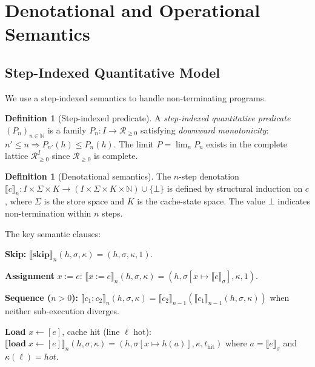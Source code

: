 \documentclass[acmsmall,sigplan,anonymous,review,screen]{acmart}
\theoremstyle{plain}
\theoremstyle{definition}
\newtheorem{definition}[theorem]{Definition}
\begin{document}
\section{Denotational and Operational Semantics}
\label{sec:semantics}

\subsection{Step-Indexed Quantitative Model}
\label{sec:semantics:model}

We use a step-indexed semantics to handle non-terminating programs.

\begin{definition}[Step-indexed predicate]
\label{def:si-pred}
  A \emph{step-indexed quantitative predicate} $(P_n)_{n \in \mathbb{N}}$
  is a family $P_n : I \to \mathcal{R}_{\geq 0}$ satisfying
  \emph{downward monotonicity}: $n' \leq n \Rightarrow P_{n'}(h) \leq P_n(h)$.
  The limit $P = \lim_n P_n$ exists in the complete lattice
  $\mathcal{R}_{\geq 0}^I$ since $\mathcal{R}_{\geq 0}$ is complete.
\end{definition}

\begin{definition}[Denotational semantics]
\label{def:denotation}
  The $n$-step denotation
  $\llbracket c \rrbracket_n : I \times \Sigma \times K \to
  (I \times \Sigma \times K \times \mathbb{N}) \cup \{\bot\}$
  is defined by structural induction on $c$, where $\Sigma$ is the
  store space and $K$ is the cache-state space.
  The value $\bot$ indicates non-termination within $n$ steps.
\end{definition}

The key semantic clauses:

\medskip
\noindent\textbf{Skip:}
$\llbracket \mathbf{skip} \rrbracket_n(h, \sigma, \kappa) = (h, \sigma, \kappa, 1)$.

\medskip
\noindent\textbf{Assignment} $x := e$:
$\llbracket x := e \rrbracket_n(h, \sigma, \kappa) = (h, \sigma[x \mapsto \llbracket e \rrbracket_\sigma], \kappa, 1)$.

\medskip
\noindent\textbf{Sequence ($n > 0$):}
$\llbracket c_1 ; c_2 \rrbracket_n(h, \sigma, \kappa) =
\llbracket c_2 \rrbracket_{n-1}(\llbracket c_1 \rrbracket_{n-1}(h, \sigma, \kappa))$
when neither sub-execution diverges.

\medskip
\noindent\textbf{Load} $x \leftarrow [e]$, cache hit (line $\ell$ hot):
$\llbracket \mathbf{load}\; x \leftarrow [e] \rrbracket_n(h, \sigma, \kappa) =
(h, \sigma[x \mapsto h(a)], \kappa, t_{\mathrm{hit}})$
where $a = \llbracket e \rrbracket_\sigma$ and $\kappa(\ell) = \mathit{hot}$.
\end{document}
